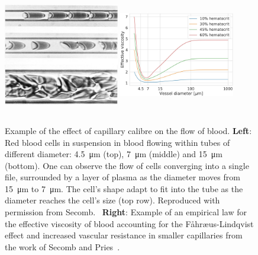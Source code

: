 \documentclass[12pt,a4paper]{journal}
\begin{document}
\begin{figure}[t]
  \centering
  \includegraphics[width=0.45\textwidth, height=5.3cm]{cropped-RBC-in-capillaries.jpg}
  \hfill
  \includegraphics[width=0.45\textwidth, height=5.3cm]{EffectiveViscosity-Secomb.jpeg}
  \caption{Example of the effect of capillary calibre on the flow of blood. \textbf{Left}: Red blood cells in suspension in blood flowing within tubes of different diameter: \SI{4.5}{\micro\meter} (top), \SI{7}{\micro\meter} (middle) and \SI{15}{\micro\meter} (bottom). One can observe the flow of cells converging into a single file, surrounded by a layer of plasma as the diameter moves from \SI{15}{\micro\meter} to \SI{7}{\micro\meter}. The cell's shape adapt to fit into the tube as the diameter reaches the cell's size (top row). Reproduced with permission from Secomb.~\cite{Secomb_2003} \textbf{Right}: Example of an empirical law for the effective viscosity of blood accounting for the F\r{a}hr\ae us-Lindqvist effect and increased vascular resistance in smaller capillaries from the work of Secomb and Pries~\cite{Secomb_2013}.}
  \label{fig:effectiveViscosity}
\end{figure}
\end{document}
